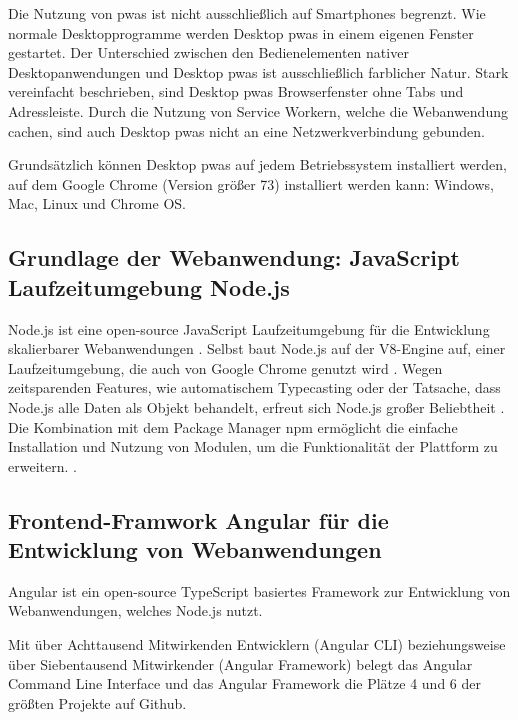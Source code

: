 Die Nutzung von \ac{pwa}s ist nicht ausschließlich auf Smartphones begrenzt. Wie normale Desktopprogramme werden Desktop \ac{pwa}s in einem eigenen Fenster gestartet. 
Der Unterschied zwischen den Bedienelementen nativer Desktopanwendungen und Desktop \ac{pwa}s ist ausschließlich farblicher Natur. Stark vereinfacht beschrieben, sind Desktop \ac{pwa}s Browserfenster ohne Tabs und Adressleiste. Durch die Nutzung von Service Workern, welche die Webanwendung cachen, sind auch Desktop \ac{pwa}s nicht an eine Netzwerkverbindung gebunden.

Grundsätzlich können Desktop \ac{pwa}s auf jedem Betriebssystem installiert werden, auf dem Google Chrome (Version größer 73) installiert werden kann: Windows, Mac, Linux und Chrome OS.
\cite{GooglePWADesktop}



\subsection{Grundlage der Webanwendung: JavaScript Laufzeitumgebung Node.js}

Node.js ist eine open-source JavaScript Laufzeitumgebung für die Entwicklung skalierbarer Webanwendungen 
\cite{NodeJSWebsiteAbout}.
Selbst baut Node.js auf der V8-Engine auf, einer Laufzeitumgebung, die auch von Google Chrome genutzt wird 
\cite[S. 1]{NodeJSRecepies}.
Wegen zeitsparenden Features, wie automatischem Typecasting oder der Tatsache, dass Node.js alle Daten als Objekt behandelt, erfreut sich Node.js großer Beliebtheit 
\cite[S. 12]{PracitalNodeJS}.
Die Kombination mit dem Package Manager npm ermöglicht die einfache Installation und Nutzung von Modulen, um die Funktionalität der Plattform zu erweitern. 
\cite[S. 9]{NodeJSRecepies}.


\subsection{Frontend-Framwork Angular für die Entwicklung von Webanwendungen}

Angular ist ein open-source TypeScript basiertes Framework zur Entwicklung von Webanwendungen, welches Node.js nutzt.


Mit über Achttausend Mitwirkenden Entwicklern (Angular CLI) beziehungsweise über Siebentausend Mitwirkender (Angular Framework) belegt das Angular Command Line Interface und das Angular Framework die Plätze 4 und 6 der größten Projekte auf Github. 
\cite{OctoverseGitHubStatistics}

